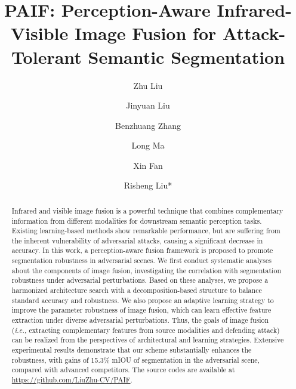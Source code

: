 \documentclass[sigconf]{acmart}
\begin{document}
\title{PAIF:  Perception-Aware   Infrared-Visible Image Fusion for Attack-Tolerant  Semantic Segmentation}




\author{Zhu Liu}

\author{Jinyuan Liu}

\author{Benzhuang Zhang}


\author{Long Ma}


\author{Xin Fan}

\author{Risheng Liu*}
\makeatletter
\def\authornotetext#1{
	\if@ACM@anonymous\else
	\g@addto@macro\@authornotes{
		\stepcounter{footnote}\footnotetext{#1}}
	\fi}
\makeatother
\authornotetext{Corresponding author: Risheng Liu.}
\renewcommand{\shortauthors}{Zhu Liu et al.}

\begin{abstract}
Infrared and visible image fusion is a powerful technique that combines complementary information from different modalities for downstream semantic perception tasks. Existing learning-based   methods show remarkable performance, but are suffering from the inherent vulnerability of adversarial attacks, causing a significant decrease in accuracy. In this work, a perception-aware fusion framework is proposed to promote segmentation robustness in adversarial scenes. 
We first conduct systematic analyses about the components of image fusion, investigating the correlation with segmentation robustness under adversarial perturbations. Based on these analyses, we propose a harmonized architecture search with a decomposition-based structure to balance standard accuracy and robustness. We also propose an adaptive learning strategy to improve the parameter robustness of image fusion, which can learn effective feature extraction under diverse adversarial perturbations. Thus, the goals of image fusion (\textit{i.e.,} extracting complementary features from source modalities and defending attack) can be realized from the perspectives of architectural and learning strategies.
Extensive experimental results demonstrate that our scheme substantially enhances the robustness, with gains of 15.3\% mIOU of segmentation in the adversarial scene, compared with  advanced competitors. The source codes are available at \url{https://github.com/LiuZhu-CV/PAIF}.
\end{abstract}
\end{document}
